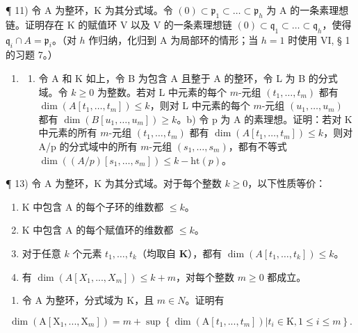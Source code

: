 ¶ 11) 令 A 为整环，K 为其分式域。令 \((0) \subset \mathfrak{p}_1 \subset \ldots \subset \mathfrak{p}_h\) 为 A 的一条素理想链。证明存在 K 的赋值环 V 以及 V 的一条素理想链 \((0) \subset \mathfrak{q}_1 \subset \ldots \subset \mathfrak{q}_h\)，使得 \(\mathfrak{q}_i \cap A = \mathfrak{p}_i\)。（对 \(h\) 作归纳，化归到 A 为局部环的情形；当 \(h = 1\) 时使用 VI, § 1 的习题 7。）

\begin{enumerate}
\def\labelenumi{\arabic{enumi})}
\setcounter{enumi}{11}
\tightlist
\item
  \begin{enumerate}
  \def\labelenumii{\alph{enumii})}
  \tightlist
  \item
    令 A 和 K 如上，令 B 为包含 A 且整于 A 的整环，令 L 为 B 的分式域。令 \(k \geqslant 0\) 为整数。若对 L 中元素的每个 \(m\)-元组 \((t_1, \ldots, t_m)\) 都有 \(\dim(A[t_1, \ldots, t_m]) \leqslant k\)，则对 L 中元素的每个 \(m\)-元组 \((u_1, \ldots, u_m)\) 都有 \(\dim(B[u_1, \ldots, u_m]) \geqslant k\)。b) 令 p 为 A 的素理想。证明：若对 K 中元素的所有 \(m\)-元组 \((t_1, \ldots, t_m)\) 都有 \(\dim(A[t_1, \ldots, t_m]) \leqslant k\)，则对 A/p 的分式域中的所有 \(m\)-元组 \((s_1, \ldots, s_m)\)，都有不等式 \(\dim((A/p)[s_1, \ldots, s_m]) \leqslant k - \text{ht}(p)\)。
  \end{enumerate}
\end{enumerate}

¶ 13) 令 A 为整环，K 为其分式域。对于每个整数 \(k \geqslant 0\)，以下性质等价：

\begin{enumerate}
\def\labelenumi{(\roman{enumi})}
\item
  K 中包含 A 的每个子环的维数都 \(\leqslant k\)。
\item
  K 中包含 A 的每个赋值环的维数都 \(\leqslant k\)。
\item
  对于任意 \(k\) 个元素 \(t_1, \ldots, t_k\)（均取自 \(\mathbf{K}\)），都有 \(\dim(A[t_1, \ldots, t_k]) \leqslant k\)。
\item
  有 \(\dim(A[X_1, ..., X_m]) \leqslant k + m\)，对每个整数 \(m \geqslant 0\) 都成立。
\end{enumerate}

\begin{enumerate}
\def\labelenumi{\arabic{enumi})}
\setcounter{enumi}{13}
\tightlist
\item
  令 A 为整环，分式域为 K，且 \(m \in N\)。证明有
\end{enumerate}

\[
\dim (\mathrm{A} [ \mathrm{X} _ {1},..., \mathrm{X} _ {m} ]) = m + \sup \left\{\dim (\mathrm{A} [ t _ {1},..., t _ {m} ]) | t _ {i} \in \mathrm{K}, 1 \leqslant i \leqslant m \right\}.
\]

